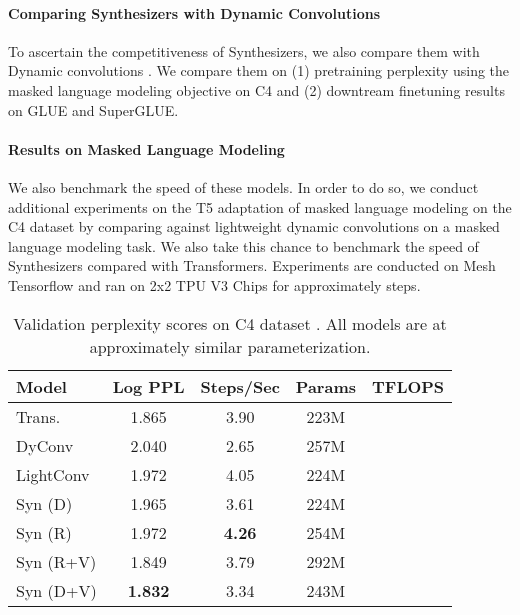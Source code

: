 \documentclass{article}
\begin{document}
 









\paragraph{Comparing Synthesizers with Dynamic Convolutions}
To ascertain the competitiveness of Synthesizers, we also compare them with Dynamic convolutions \citep{wu2019pay}. We compare them on (1) pretraining perplexity using the masked language modeling objective on C4 and (2) downtream finetuning results on GLUE and SuperGLUE.

\paragraph{Results on Masked Language Modeling}
We also benchmark the speed of these models. In order to do so, we conduct additional experiments on the T5 adaptation of masked language modeling on the C4 dataset \citep{raffel2019exploring} by comparing against lightweight dynamic convolutions \citep{wu2019pay} on a masked language modeling task. We also take this chance to benchmark the speed of Synthesizers compared with Transformers. Experiments are conducted on Mesh Tensorflow \citep{shazeer2018mesh} and ran on 2x2 TPU V3 Chips for approximately  steps.
\begin{table}[]
    \centering
    \small
    \begin{tabular}{l|cccc}
    \toprule
       Model  &  Log PPL & Steps/Sec & Params & TFLOPS\\
       \midrule
        Trans. & 1.865 & 3.90 & 223M & \\ 
DyConv  & 2.040 & 2.65 & 257M & \\ 
        LightConv & 1.972 & 4.05 & 224M &  \\ \hline
        Syn (D) & 1.965 & 3.61 & 224M  & \\ 
        Syn (R) & 1.972 & \textbf{4.26} & 254M &  \\ 
        Syn (R+V) & 1.849 & 3.79 & 292M & \\
        Syn (D+V) & \textbf{1.832} & 3.34 & 243M & \\ 
        \bottomrule
    \end{tabular}
    \caption{Validation perplexity scores on C4 dataset \citep{raffel2019exploring}. All models are at approximately similar parameterization.}
    \label{tab:ppl}
\end{table}
\end{document}
